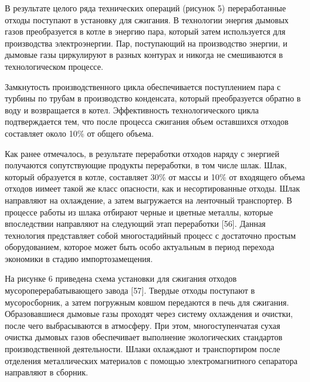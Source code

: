 \begin{multicols}{2}
В результате целого ряда технических операций (рисунок 5) переработанные
отходы поступают в установку для сжигания. В технологии энергия дымовых
газов преобразуется в котле в энергию пара, который затем используется
для производства электроэнергии. Пар, поступающий на производство
энергии, и дымовые газы циркулируют в разных контурах и никогда не
смешиваются в технологическом процессе.

Замкнутость производственного цикла обеспечивается поступлением пара с
турбины по трубам в производство конденсата, который преобразуется
обратно в воду и возвращается в котел. Эффективность технологического
цикла подтверждается тем, что после процесса сжигания объем оставшихся
отходов составляет около 10\% от общего объема.

Как ранее отмечалось, в результате переработки отходов наряду с энергией
получаются сопутствующие продукты переработки, в том числе шлак. Шлак,
который образуется в котле, составляет 30\% от массы и 10\% от входящего
объема отходов иимеет такой же класс опасности, как и несортированные
отходы. Шлак направляют на охлаждение, а затем выгружается на ленточный
транспортер. В процессе работы из шлака отбирают черные и цветные
металлы, которые впоследствии направляют на следующий этап переработки
{[}56{]}. Данная технология представляет собой многостадийный процесс с
достаточно простым оборудованием, которое может быть особо актуальным в
период перехода экономики в стадию импортозамещения.

На рисунке 6 приведена схема установки для сжигания отходов
мусороперерабатывающего завода {[}57{]}. Твердые отходы поступают в
мусоросборник, а затем погружным ковшом передаются в печь для сжигания.
Образовавшиеся дымовые газы проходят через систему охлаждения и очистки,
после чего выбрасываются в атмосферу. При этом, многоступенчатая сухая
очистка дымовых газов обеспечивает выполнение экологических стандартов
производственной деятельности. Шлаки охлаждают и транспортиром после
отделения металлических материалов с помощью электромагнитного
сепаратора направляют в сборник.
\end{multicols}

